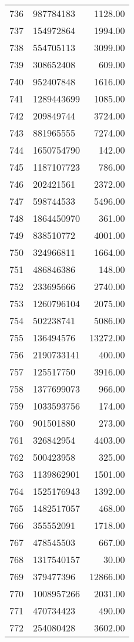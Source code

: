 \begin{table}[ht]
\begin{tabular}{rlr}
  736 & 987784183 & 1128.00 \\ 
  737 & 154972864 & 1994.00 \\ 
  738 & 554705113 & 3099.00 \\ 
  739 & 308652408 & 609.00 \\ 
  740 & 952407848 & 1616.00 \\ 
  741 & 1289443699 & 1085.00 \\ 
  742 & 209849744 & 3724.00 \\ 
  743 & 881965555 & 7274.00 \\ 
  744 & 1650754790 & 142.00 \\ 
  745 & 1187107723 & 786.00 \\ 
  746 & 202421561 & 2372.00 \\ 
  747 & 598744533 & 5496.00 \\ 
  748 & 1864450970 & 361.00 \\ 
  749 & 838510772 & 4001.00 \\ 
  750 & 324966811 & 1664.00 \\ 
  751 & 486846386 & 148.00 \\ 
  752 & 233695666 & 2740.00 \\ 
  753 & 1260796104 & 2075.00 \\ 
  754 & 502238741 & 5086.00 \\ 
  755 & 136494576 & 13272.00 \\ 
  756 & 2190733141 & 400.00 \\ 
  757 & 125517750 & 3916.00 \\ 
  758 & 1377699073 & 966.00 \\ 
  759 & 1033593756 & 174.00 \\ 
  760 & 901501880 & 273.00 \\ 
  761 & 326842954 & 4403.00 \\ 
  762 & 500423958 & 325.00 \\ 
  763 & 1139862901 & 1501.00 \\ 
  764 & 1525176943 & 1392.00 \\ 
  765 & 1482517057 & 468.00 \\ 
  766 & 355552091 & 1718.00 \\ 
  767 & 478545503 & 667.00 \\ 
  768 & 1317540157 & 30.00 \\ 
  769 & 379477396 & 12866.00 \\ 
  770 & 1008957266 & 2031.00 \\ 
  771 & 470734423 & 490.00 \\ 
  772 & 254080428 & 3602.00 \\ 

\end{tabular}
\end{table}
